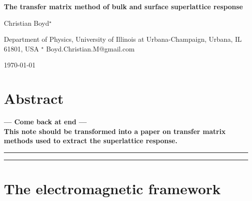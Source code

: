 \documentclass{article}
\begin{document}
\begin{center}{\Large \textbf{
The transfer matrix method of bulk and surface superlattice response
}}\end{center}

\begin{center}
Christian Boyd$^\star$
\end{center}

\begin{center}
Department of Physics, University of Illinois at Urbana-Champaign, Urbana, IL 61801, USA
${}^\star$ {\small \sf Boyd.Christian.M@gmail.com}
\end{center}

\begin{center}
\today
\end{center}


\section*{Abstract}
{\bf
--- Come back at end ---\\
This note should be transformed into a paper on transfer matrix methods used to extract the superlattice response.
}


\vspace{10pt}
\noindent\rule{\textwidth}{1pt}
\tableofcontents\thispagestyle{fancy}
\noindent\rule{\textwidth}{1pt}
\vspace{10pt}











\section{The electromagnetic framework}
\label{section: electromagnetic framework}
\end{document}
